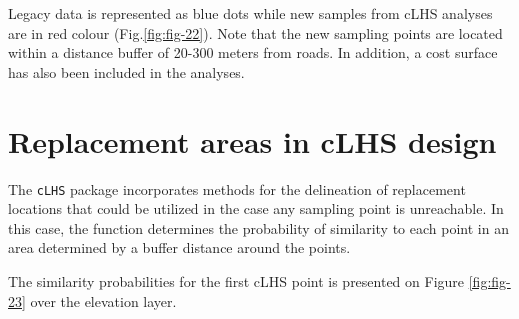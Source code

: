 \documentclass[
  10pt,
  b5paper,
  oneside]{book}
\newenvironment{Shaded}{\begin{snugshade}}{\end{snugshade}}
\newcommand{\AttributeTok}[1]{\textcolor[rgb]{0.77,0.63,0.00}{#1}}
\newcommand{\CommentTok}[1]{\textcolor[rgb]{0.56,0.35,0.01}{\textit{#1}}}
\newcommand{\DocumentationTok}[1]{\textcolor[rgb]{0.56,0.35,0.01}{\textbf{\textit{#1}}}}
\newcommand{\FunctionTok}[1]{\textcolor[rgb]{0.00,0.00,0.00}{#1}}
\newcommand{\NormalTok}[1]{#1}
\newcommand{\OtherTok}[1]{\textcolor[rgb]{0.56,0.35,0.01}{#1}}
\newcommand{\SpecialCharTok}[1]{\textcolor[rgb]{0.00,0.00,0.00}{#1}}
\begin{document}
Legacy data is represented as blue dots while new samples from cLHS analyses are in red colour (Fig.\ref{fig:fig-22}). Note that the new sampling points are located within a distance buffer of 20-300 meters from roads. In addition, a cost surface has also been included in the analyses.

\hypertarget{replacement-areas-in-clhs-design}{%
\section{Replacement areas in cLHS design}\label{replacement-areas-in-clhs-design}}

The \texttt{\textquotesingle{}cLHS\textquotesingle{}} package incorporates methods for the delineation of replacement locations that could be utilized in the case any sampling point is unreachable. In this case, the function determines the probability of similarity to each point in an area determined by a buffer distance around the points.

\begin{Shaded}
\end{Shaded}

The similarity probabilities for the first cLHS point is presented on Figure \ref{fig:fig-23} over the elevation layer.
\end{document}
